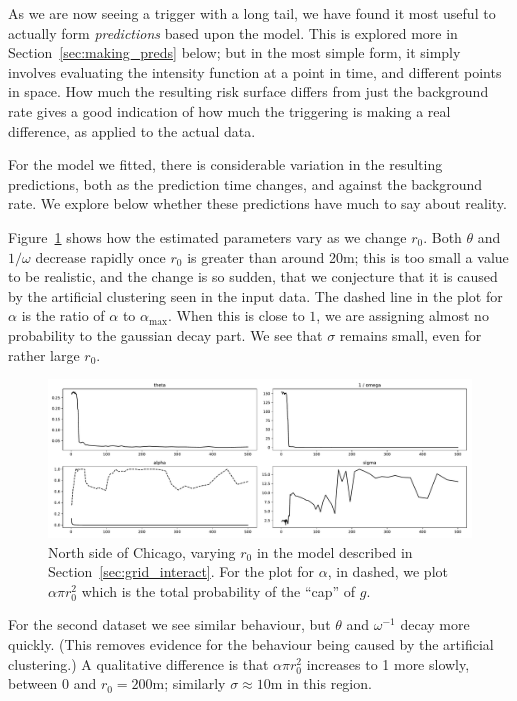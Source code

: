 \documentclass[twoside,a4paper]{article}
\theoremstyle{plain}
\theoremstyle{definition}
\begin{document}
As we are now seeing a trigger with a long tail, we have found it most useful to actually
form \emph{predictions} based upon the model.  This is explored more in
Section~\ref{sec:making_preds} below; but in the most simple form, it simply involves
evaluating the intensity function at a point in time, and different points in space.
How much the resulting risk surface differs from just the background rate gives a good
indication of how much the triggering is making a real difference, as applied to the actual data.

For the model we fitted, there is considerable variation in the resulting predictions,
both as the prediction time changes, and against the background rate.  We explore below whether
these predictions have much to say about reality.

Figure~\ref{fig:grid_vary_r0} shows how the estimated parameters vary as we change $r_0$.
Both $\theta$ and $1/\omega$ decrease rapidly once $r_0$ is greater than around 20m; this
is too small a value to be realistic, and the change is so sudden, that we conjecture that
it is caused by the artificial clustering
seen in the input data.  The dashed line in the plot for $\alpha$ is the ratio of $\alpha$ to
$\alpha_{\max}$.  When this is close to $1$, we are assigning almost no probability to the
gaussian decay part.  We see that $\sigma$ remains small, even for rather large $r_0$.

\begin{figure}
  \includegraphics[width=\textwidth]{../notebooks/varying_r0.pdf}
  \caption{North side of Chicago, varying $r_0$ in the model described in Section~\ref{sec:grid_interact}.  For the plot for $\alpha$, in dashed, we plot $\alpha \pi r_0^2$
which is the total probability of the ``cap'' of $g$.}
  \label{fig:grid_vary_r0}
\end{figure}

For the second dataset we see similar behaviour, but $\theta$ and $\omega^{-1}$ decay more
quickly.  (This removes evidence for the behaviour being caused by the artificial clustering.)
A qualitative difference is that $\alpha \pi r_0^2$ increases to 1 more slowly, between 0
and $r_0 = 200$m; similarly $\sigma\approx 10$m in this region.
\end{document}
